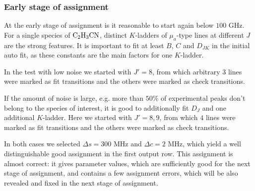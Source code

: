 \documentclass[11pt]{article}
\begin{document}
\subsubsection{Early stage of assignment}

At the early stage of assignment is it reasonable to start again below $100$ GHz. 
For a single species of $\rm C_2H_3CN$, 
distinct $K$-ladders of $\mu_a$-type lines at different $J$ are the strong features. %
It is important to fit at least $B$, $C$ and $D_{JK}$ in the initial auto fit, as these constants are the main factors for one $K$-ladder. 

In the test with low noise  we started with $J' = 8$, from which arbitrary $3$ lines were marked as fit transitions and the others were marked as check transitions. 

If the amount of noise is large, e.g. more than $50\%$ of  experimental peaks don't belong to the species of interest, it is good to additionally fit $D_J$ and one additional $K$-ladder. Here we started with $J' = 8, 9$, from which $4$ lines were marked as fit transitions and the others were marked as check transitions.

In both cases we selected $\Delta s = 300$ MHz and $\Delta c = 2$ MHz, which yield a  well distinguishable good assignment in the first output row. This assignment is almost correct: it gives parameter values, which are sufficiently good for the next stage of assignment, and contains a few assignment errors, which will be also revealed and fixed in the next stage of assignment. 


\end{document}
